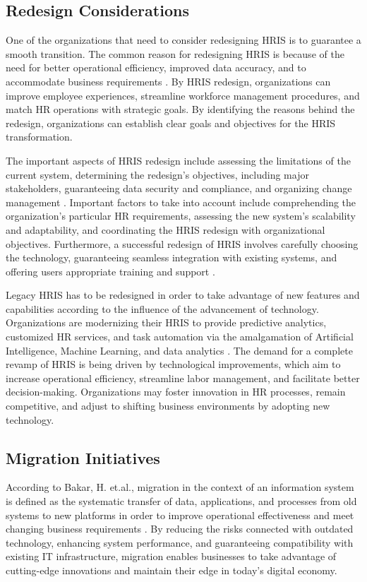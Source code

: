     \subsection{Redesign Considerations}
         One of the organizations that need to consider redesigning HRIS is to guarantee a smooth transition. The common reason for redesigning HRIS is because of the need for better operational efficiency, improved data accuracy, and to accommodate business requirements \cite{m12023}. By HRIS redesign, organizations can improve employee experiences, streamline workforce management procedures, and match HR operations with strategic goals. By identifying the reasons behind the redesign, organizations can establish clear goals and objectives for the HRIS transformation.

        The important aspects of HRIS redesign include assessing the limitations of the current system, determining the redesign's objectives, including major stakeholders, guaranteeing data security and compliance, and organizing change management \cite{is12020}. Important factors to take into account include comprehending the organization's particular HR requirements, assessing the new system's scalability and adaptability, and coordinating the HRIS redesign with organizational objectives. Furthermore, a successful redesign of HRIS involves carefully choosing the technology, guaranteeing seamless integration with existing systems, and offering users appropriate training and support \cite{ymqz12022}.
        
        Legacy HRIS has to be redesigned in order to take advantage of new features and capabilities according to the influence of the advancement of technology. Organizations are modernizing their HRIS to provide predictive analytics, customized HR services, and task automation via the amalgamation of Artificial Intelligence, Machine Learning, and data analytics \cite{mee12022}. The demand for a complete revamp of HRIS is being driven by technological improvements, which aim to increase operational efficiency, streamline labor management, and facilitate better decision-making. Organizations may foster innovation in HR processes, remain competitive, and adjust to shifting business environments by adopting new technology.
    
    \subsection{Migration Initiatives}
        According to Bakar, H. et.al.,  migration in the context of an information system is defined as the systematic transfer of data, applications, and processes from old systems to new platforms in order to improve operational effectiveness and meet changing business requirements \cite{hrd12022}. By reducing the risks connected with outdated technology, enhancing system performance, and guaranteeing compatibility with existing IT infrastructure, migration enables businesses to take advantage of cutting-edge innovations and maintain their edge in today's digital economy.
        
